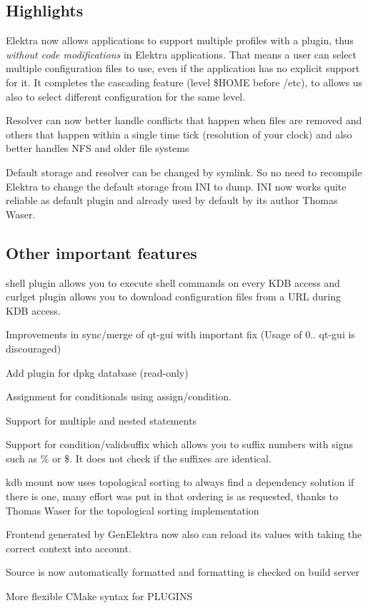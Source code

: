 \subsection*{Highlights}


\begin{DoxyItemize}
\item Elektra now allows applications to support multiple profiles with a plugin, thus {\itshape without code modifications} in Elektra applications. That means a user can select multiple configuration files to use, even if the application has no explicit support for it. It completes the cascading feature (level \$\+H\+O\+ME before /etc), to allows us also to select different configuration for the same level.
\item Resolver can now better handle conflicts that happen when files are removed and others that happen within a single time tick (resolution of your clock) and also better handles N\+FS and older file systems
\item Default storage and resolver can be changed by symlink. So no need to recompile Elektra to change the default storage from I\+NI to dump. I\+NI now works quite reliable as default plugin and already used by default by its author Thomas Waser.
\end{DoxyItemize}

\subsection*{Other important features}


\begin{DoxyItemize}
\item shell plugin allows you to execute shell commands on every K\+DB access and curlget plugin allows you to download configuration files from a U\+RL during K\+DB access.
\item Improvements in sync/merge of qt-\/gui with important fix (Usage of 0.. qt-\/gui is discouraged)
\item Add plugin for dpkg database (read-\/only)
\item Assignment for conditionals using {\ttfamily assign/condition}.
\item Support for multiple and nested statements
\item Support for {\ttfamily condition/validsuffix} which allows you to suffix numbers with signs such as {\ttfamily \%} or {\ttfamily \$}. It does not check if the suffixes are identical.
\item kdb mount now uses topological sorting to always find a dependency solution if there is one, many effort was put in that ordering is as requested, thanks to Thomas Waser for the topological sorting implementation
\item Frontend generated by Gen\+Elektra now also can reload its values with taking the correct context into account.
\item Source is now automatically formatted and formatting is checked on build server
\item More flexible C\+Make syntax for P\+L\+U\+G\+I\+NS
\end{DoxyItemize}

